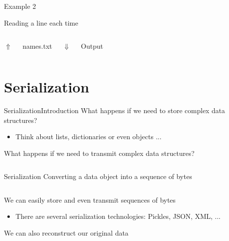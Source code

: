 \documentclass[10pt,compress]{beamer} %
\begin{document}
\begin{frame}[fragile]{Example 2}
	\begin{exampleblock}{Reading a line each time}
	\vspace{-0.2cm}
	
	\vspace{-0.2cm}
	\end{exampleblock}

	\begin{columns}
    \centering $\Uparrow$
	\begin{exampleblock}{names.txt}
	
	\end{exampleblock}
    \centering $\Downarrow$
	\begin{exampleblock}{Output}
	
	\end{exampleblock}
	\end{columns}
	
\end{frame}

\section{Serialization}

\begin{frame}[fragile]{Serialization}{Introduction}
    What happens if we need to store complex data structures?
		\begin{itemize}
			\item Think about lists, dictionaries or even objects ...
		\end{itemize}
    What happens if we need to transmit complex data structures?

	\begin{columns}
	\column{.6\textwidth}
	\begin{block}{Serialization}
    Converting a data object into a sequence of bytes
	\end{block}
    \end{columns}

    \bigskip

    We can easily store and even transmit sequences of bytes
	\begin{itemize}
		\item There are several serialization technologies: Pickles, JSON, XML, ...
	\end{itemize}
    We can also reconstruct our original data

\end{frame}
\end{document}
